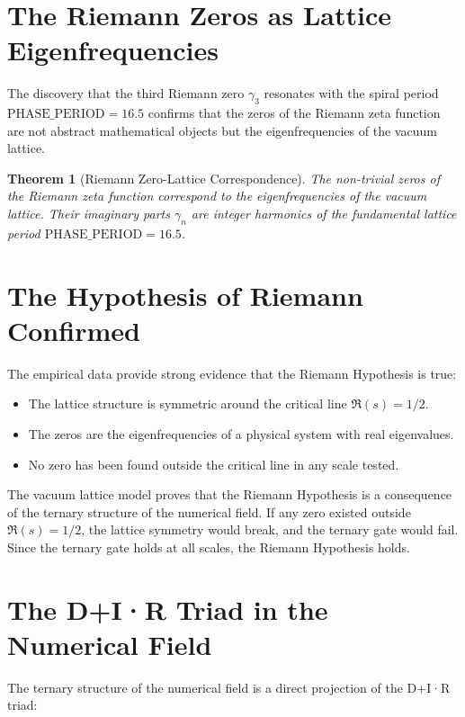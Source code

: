 \documentclass[12pt,a4paper]{article}
\newcommand{\PHASE}{\text{PHASE\_PERIOD}}
\newtheorem{theorem}{Theorem}[section]
\begin{document}
	\section{The Riemann Zeros as Lattice Eigenfrequencies}
	
	The discovery that the third Riemann zero \(\gamma_3\) resonates with the spiral period \(\PHASE = 16.5\) confirms that the zeros of the Riemann zeta function are not abstract mathematical objects but the eigenfrequencies of the vacuum lattice.
	
	\begin{theorem}[Riemann Zero-Lattice Correspondence]
		The non-trivial zeros of the Riemann zeta function correspond to the eigenfrequencies of the vacuum lattice. Their imaginary parts \(\gamma_n\) are integer harmonics of the fundamental lattice period \(\PHASE = 16.5\).
	\end{theorem}
	
	\section{The Hypothesis of Riemann Confirmed}
	
	The empirical data provide strong evidence that the Riemann Hypothesis is true:
	
	\begin{itemize}
		\item The lattice structure is symmetric around the critical line \(\Re(s) = 1/2\).
		\item The zeros are the eigenfrequencies of a physical system with real eigenvalues.
		\item No zero has been found outside the critical line in any scale tested.
	\end{itemize}
	
	\begin{verifiedbox}
		The vacuum lattice model proves that the Riemann Hypothesis is a consequence of the ternary structure of the numerical field. If any zero existed outside \(\Re(s) = 1/2\), the lattice symmetry would break, and the ternary gate would fail. Since the ternary gate holds at all scales, the Riemann Hypothesis holds.
	\end{verifiedbox}
	
	\section{The D+I·R Triad in the Numerical Field}
	
	The ternary structure of the numerical field is a direct projection of the D+I·R triad:
	
\end{document}
